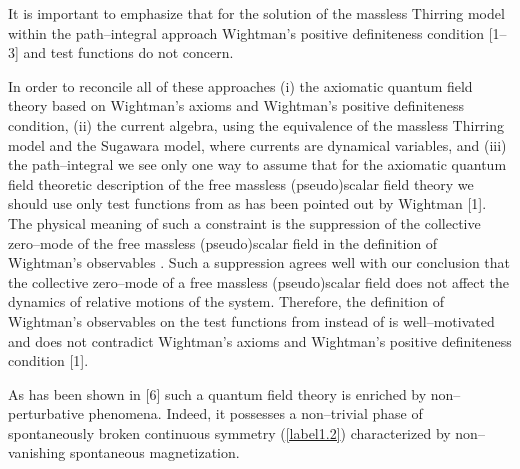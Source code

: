\documentclass[a4paper,12pt] {article}
\begin{document}
It is important to emphasize that for the solution of the massless
Thirring model within the path--integral approach Wightman's positive
definiteness condition [1--3] and test functions do not concern.

In order to reconcile all of these approaches (i) the axiomatic
quantum field theory based on Wightman's axioms and Wightman's
positive definiteness condition, (ii) the current algebra, using the
equivalence of the massless Thirring model and the Sugawara model,
where currents are dynamical variables, and (iii) the path--integral
we see only one way to assume that for the axiomatic quantum field
theoretic description of the free massless (pseudo)scalar field theory
we should use only test functions from \coordHE{}
as has been pointed out by Wightman [1]. The physical meaning of such
a constraint is the suppression of the collective zero--mode of the
free massless (pseudo)scalar field \coordHE{} in the definition of
Wightman's observables \coordHE{}. Such a suppression agrees well
with our conclusion that the collective zero--mode of a free massless
(pseudo)scalar field does not affect the dynamics of relative motions
of the system.  Therefore, the definition of Wightman's observables on
the test functions from \coordHE{} instead of \coordHE{} is well--motivated and does not contradict
Wightman's axioms and Wightman's positive definiteness condition [1].

As has been shown in [6] such a quantum field theory is enriched by
non--perturbative phenomena. Indeed, it possesses a non--trivial phase
of spontaneously broken continuous symmetry (\ref{label1.2})
characterized by non--vanishing spontaneous magnetization.
\end{document}
